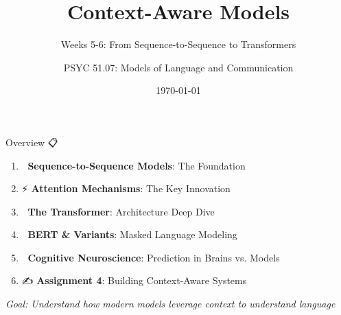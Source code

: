 \documentclass[aspectratio=169]{beamer}
\title{Context-Aware Models}
\subtitle{Weeks 5-6: From Sequence-to-Sequence to Transformers}
\author{PSYC 51.07: Models of Language and Communication}
\date{\today}
\begin{document}
\begin{frame}[shrink=10]
\titlepage
\end{frame}

\begin{frame}[shrink=10]{Overview 📋}
\large
\begin{enumerate}\setlength{\itemsep}{0pt}
    \item 🔄 \textbf{Sequence-to-Sequence Models}: The Foundation
    \item ⚡ \textbf{Attention Mechanisms}: The Key Innovation
    \item 🤖 \textbf{The Transformer}: Architecture Deep Dive
    \item 🎯 \textbf{BERT \& Variants}: Masked Language Modeling
    \item 🧠 \textbf{Cognitive Neuroscience}: Prediction in Brains vs. Models
    \item ✍️ \textbf{Assignment 4}: Building Context-Aware Systems
\end{enumerate}

\vspace{1em}
\textit{Goal: Understand how modern models leverage context to understand language}
\end{frame}
\end{document}
